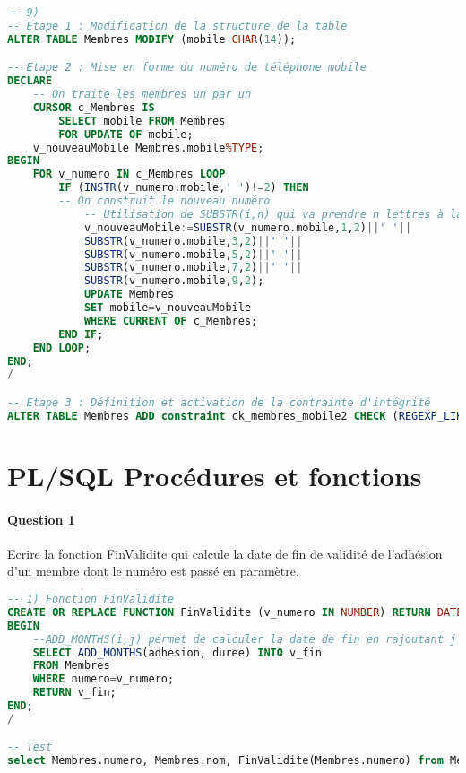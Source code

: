 \documentclass[10pt, oneside]{article}
\begin{document}
\begin{lstlisting}[language=sql, title=Question 9, label=QIV9]
-- 9)
-- Etape 1 : Modification de la structure de la table
ALTER TABLE Membres MODIFY (mobile CHAR(14));

-- Etape 2 : Mise en forme du numéro de téléphone mobile
DECLARE
	-- On traite les membres un par un 
	CURSOR c_Membres IS
		SELECT mobile FROM Membres
		FOR UPDATE OF mobile;
	v_nouveauMobile Membres.mobile%TYPE;
BEGIN
	FOR v_numero IN c_Membres LOOP
		IF (INSTR(v_numero.mobile,' ')!=2) THEN
		-- On construit le nouveau numéro
			-- Utilisation de SUBSTR(i,n) qui va prendre n lettres à la position i
			v_nouveauMobile:=SUBSTR(v_numero.mobile,1,2)||' '||
			SUBSTR(v_numero.mobile,3,2)||' '||
			SUBSTR(v_numero.mobile,5,2)||' '||
			SUBSTR(v_numero.mobile,7,2)||' '||
			SUBSTR(v_numero.mobile,9,2);
			UPDATE Membres
			SET mobile=v_nouveauMobile
			WHERE CURRENT OF c_Membres;
		END IF;
	END LOOP;
END;
/

-- Etape 3 : Définition et activation de la contrainte d'intégrité
ALTER TABLE Membres ADD constraint ck_membres_mobile2 CHECK (REGEXP_LIKE (mobile, '^06 [[:digit:]]{2} [[:digit:]]{2} [[:digit:]]{2} [[:digit:]]{2}$'));
\end{lstlisting}


\section{PL/SQL Procédures et fonctions}


\paragraph{Question 1} Ecrire la fonction FinValidite qui calcule la date de fin de validité de l'adhésion d'un membre dont le numéro est passé en paramètre.

\begin{lstlisting}[language=sql, title=Question 1, label=QV1]
-- 1) Fonction FinValidite
CREATE OR REPLACE FUNCTION FinValidite (v_numero IN NUMBER) RETURN DATE IS v_fin DATE;
BEGIN
	--ADD_MONTHS(i,j) permet de calculer la date de fin en rajoutant j mois à la date i
	SELECT ADD_MONTHS(adhesion, duree) INTO v_fin
	FROM Membres
	WHERE numero=v_numero;
	RETURN v_fin;
END;
/

-- Test
select Membres.numero, Membres.nom, FinValidite(Membres.numero) from Membres; 
\end{lstlisting}
\end{document}

